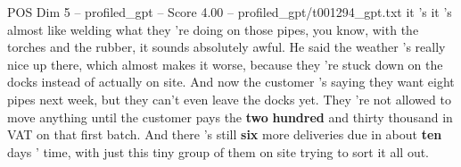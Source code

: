 \begin{textsample}{POS Dim 5 – profiled\_gpt – Score 4.00 – profiled\_gpt/t001294\_gpt.txt}  \label{ex:f5_pos_026}
it 's it 's almost like welding what they 're doing on those pipes, you know, with the torches and the rubber, it sounds absolutely awful.
He said the weather ’s really nice up there, which almost makes it worse, because they ’re stuck down on the docks instead of actually on site.
And now the customer ’s saying they want eight pipes next week, but they can't even leave the docks yet.
They ’re not allowed to move anything until the customer pays the \textbf{two} \textbf{hundred} and thirty thousand in VAT on that first batch.
And there ’s still \textbf{six} more deliveries due in about \textbf{ten} days ’ time, with just this tiny group of them on site trying to sort it all out.

\end{textsample}
